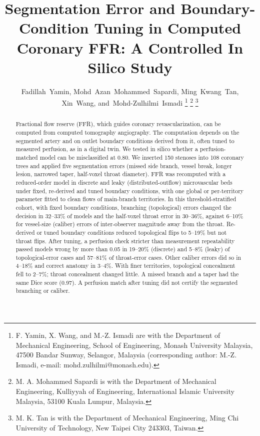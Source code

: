 \documentclass[journal,twoside,web]{ieeecolor}
\begin{document}

\title{Segmentation Error and Boundary-Condition Tuning in Computed Coronary FFR: A Controlled In Silico Study}

\author{Fadillah~Yamin,
        Mohd~Azan~Mohammed~Sapardi,
        Ming~Kwang~Tan,
        Xin~Wang,
        and~\mbox{Mohd-Zulhilmi~Ismadi}\endgraf\vspace{-\baselineskip}%
\thanks{F. Yamin, X. Wang, and M.-Z. Ismadi are with the Department of Mechanical Engineering, School of
Engineering, Monash University Malaysia, 47500 Bandar Sunway, Selangor, Malaysia (corresponding author:
M.-Z. Ismadi, e-mail: mohd.zulhilmi@monash.edu).}%
\thanks{M. A. Mohammed Sapardi is with the Department of Mechanical Engineering, Kulliyyah of Engineering,
International Islamic University Malaysia, 53100 Kuala Lumpur, Malaysia.}%
\thanks{M. K. Tan is with the Department of Mechanical Engineering, Ming Chi University of Technology, New Taipei
City 243303, Taiwan.}}


\maketitle

\begin{abstract}
Fractional flow reserve (FFR), which guides coronary revascularization, can be computed from computed tomography
angiography. The computation depends on the segmented artery and on outlet boundary conditions derived from it,
often tuned to measured perfusion, as in a digital twin. We tested in silico whether a perfusion-matched model can be
misclassified at 0.80. We inserted 150 stenoses into 108 coronary trees and applied five segmentation errors (missed side branch, vessel
break, longer lesion, narrowed taper, half-voxel throat diameter). FFR was recomputed with a reduced-order model in
discrete and leaky (distributed-outflow) microvascular beds under fixed, re-derived and tuned boundary conditions,
with one global or per-territory parameter fitted to clean flows of main-branch territories. In this threshold-stratified cohort, with fixed boundary conditions,
branching (topological) errors changed the decision in 32--33\% of models and the half-voxel throat error in
30--36\%, against 6--10\% for vessel-size (caliber) errors of inter-observer magnitude away from the throat.
Re-derived or tuned boundary conditions reduced topological flips to 5--19\% but not throat flips. After tuning, a perfusion check stricter than measurement repeatability passed models wrong by more than 0.05 in
19--20\% (discrete) and 5--8\% (leaky) of topological-error cases and 57--81\% of throat-error cases. Other caliber
errors did so in 4--18\% and correct anatomy in 3--4\%. With finer territories, topological concealment fell to
2--7\%; throat concealment changed little. A missed branch and a taper had the same Dice score (0.97).
A perfusion match after tuning did not certify the
segmented branching or caliber.
\end{abstract}
\end{document}
